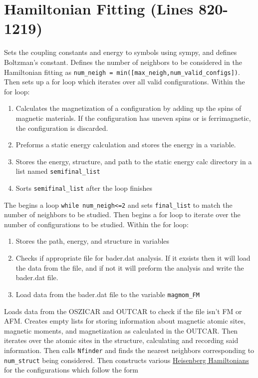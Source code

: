 \documentclass[12pt]{article}
\newcommand{\pmint}[1]{\texttt{#1}}
\begin{document}
\section*{Hamiltonian Fitting (Lines 820-1219)} %
Sets the coupling constants and energy to symbols using sympy, and defines Boltzman's constant. Defines the number of neighbors to be considered in the Hamiltonian fitting as \pmint{num_neigh = min([max_neigh,num_valid_configs])}. Then sets up a for loop which iterates over all valid configurations. Within the for loop:
\begin{enumerate}
    \item Calculates the magnetization of a configuration by adding up the spins of magnetic materials. If the configuration has uneven spins or is ferrimagnetic, the configuration is discarded. 
    \item Preforms a static energy calculation and stores the energy in a variable.
    \item Stores the energy, structure, and path to the static energy calc directory in a list named \pmint{semifinal_list}
    \item Sorts \pmint{semifinal_list} after the loop finishes
\end{enumerate}
The begins a loop \pmint{while num_neigh<=2} and sets \pmint{final_list} to match the number of neighbors to be studied. Then begins a for loop to iterate over the number of configurations to be studied. Within the for loop:
\begin{enumerate}
    \item Stores the path, energy, and structure in variables
    \item Checks if appropriate file for bader.dat analysis. If it exsists then it will load the data from the file, and if not it will preform the analysis and write the bader.dat file. 
    \item Load data from the bader.dat file to the variable \pmint{magmom_FM}
\end{enumerate}
Loads data from the OSZICAR and OUTCAR to check if the file isn't FM or AFM. Creates empty lists for storing information about magnetic atomic sites, magnetic moments, and magnetization as calculated in the OUTCAR. Then iterates over the atomic sites in the structure, calculating and recording said information. Then calls \pmint{Nfinder} and finds the nearest neighbors corresponding to \pmint{num_struct} being considered. Then constructs various \href{https://en.wikipedia.org/wiki/Quantum_Heisenberg_model}{Heisenberg Hamiltonians} for the configurations which follow the form
\end{document}
